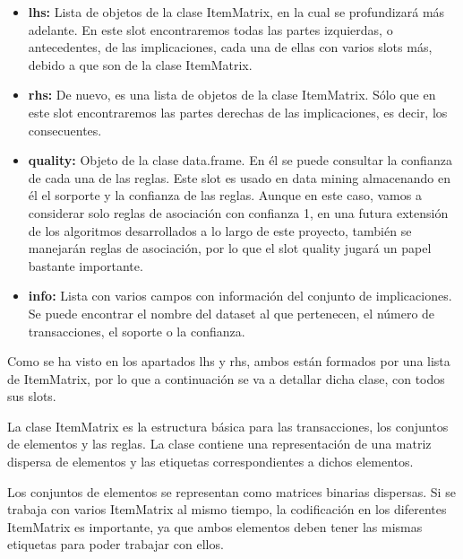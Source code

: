 \begin{itemize}
    \item \textbf{lhs:}
    Lista de objetos de la clase ItemMatrix, en la cual se profundizar\'a m\'as 
    adelante. En este slot encontraremos todas las partes izquierdas, o antecedentes, de las 
    implicaciones, cada una de ellas con varios slots m\'as, debido a que son de la 
    clase ItemMatrix. 

    \item \textbf{rhs:}
    De nuevo, es una lista de objetos de la clase ItemMatrix. S\'olo que en este 
    slot encontraremos las partes derechas de las implicaciones, es decir, los consecuentes.

    \item \textbf{quality:}
    Objeto de la clase data.frame. En \'el se puede consultar la confianza de cada 
    una de las reglas. Este slot es usado en data mining almacenando en \'el el 
    sorporte y la confianza de las reglas. Aunque en este caso, vamos a considerar 
    solo reglas de asociaci\'on con confianza 1, en una futura extensi\'on de los 
    algoritmos desarrollados a lo largo de este proyecto, tambi\'en se manejar\'an reglas de 
    asociaci\'on, por lo que el slot quality jugar\'a un papel bastante importante.

    \item \textbf{info:}
    Lista con varios campos con informaci\'on del conjunto de implicaciones. Se puede 
    encontrar el nombre del dataset al que pertenecen, el n\'umero de transacciones, 
    el soporte o la confianza.

\end{itemize}


Como se ha visto en los apartados lhs y rhs, ambos est\'an formados por una lista de 
ItemMatrix, por lo que a continuaci\'on se va a detallar dicha clase, con todos sus slots.

La clase ItemMatrix es la estructura b\'asica para las transacciones, los 
conjuntos de elementos y las reglas.
La clase contiene una representaci\'on de una matriz dispersa de elementos 
y las etiquetas correspondientes a dichos elementos.

Los conjuntos de elementos se representan como matrices binarias dispersas. 
Si se trabaja con varios ItemMatrix al mismo tiempo, la codificaci\'on 
en los diferentes ItemMatrix es importante, ya que ambos elementos deben tener 
las mismas etiquetas para poder trabajar con ellos.

